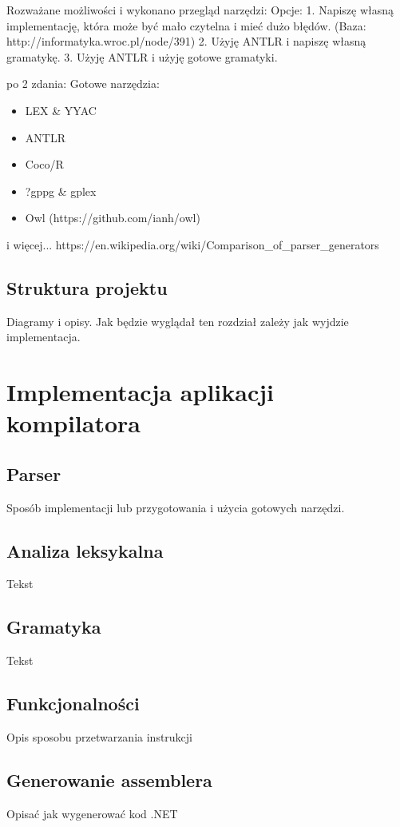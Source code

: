 \documentclass[a4paper]{article}
\begin{document}
Rozważane możliwości i wykonano przegląd narzędzi:
Opcje:
1. Napiszę własną implementację, która może być mało czytelna i mieć dużo błędów. (Baza: http://informatyka.wroc.pl/node/391)
2. Użyję ANTLR i napiszę własną gramatykę.
3. Użyję ANTLR i użyję gotowe gramatyki.

po 2 zdania: 
Gotowe narzędzia:
\begin{itemize}
  \item LEX \& YYAC
  \item ANTLR
  \item Coco/R
  \item ?gppg \& gplex
  \item Owl (https://github.com/ianh/owl)
\end{itemize}
i więcej... https://en.wikipedia.org/wiki/Comparison\_of\_parser\_generators


\subsection{Struktura projektu}
Diagramy i opisy.
Jak będzie wyglądał ten rozdział zależy jak wyjdzie implementacja.

\section{Implementacja aplikacji kompilatora}
\subsection{Parser}
Sposób implementacji lub przygotowania i użycia gotowych narzędzi.

\subsection{Analiza leksykalna}
Tekst
\subsection{Gramatyka}
Tekst
\subsection{Funkcjonalności}
Opis sposobu przetwarzania instrukcji
\subsection{Generowanie assemblera}
Opisać jak wygenerować kod .NET
\end{document}

